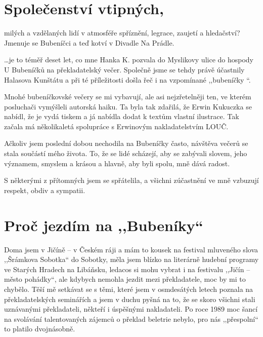  
\bigskip

\section{Společenství vtipných,}

\noindent
milých a vzdělaných lidí v atmosféře spříznění, legrace, zaujetí a hledačství? Jmenuje se Bubeníčci a teď kotví v Divadle Na Prádle. 

\ldots je to téměř deset let, co mne Hanka K. pozvala do Myslikovy ulice do hospody U Bubeníčků na překladatelský večer. Společně jsme se tehdy právě účastnily Halasova Kunštátu a při té příležitosti došla řeč i na vzpomínané ,,bubeníčky ``. 

Mnohé bubeníčkovské večery se mi vybavují, ale asi nejzřetelněji ten, ve kterém posluchači vymýšleli autorská haiku. Ta byla tak zdařilá, že Erwin Kukuczka se nabídl, že je vydá tiskem a já nabídla dodat k textům vlastní ilustrace. Tak začala má několikaletá spolupráce s Erwinovým nakladatelstvím LOUČ.

Ačkoliv jsem poslední dobou nechodila na Bubeníčky často, návštěva večerů se stala součástí mého života. To, že se lidé scházejí, aby se zabývali  slovem, jeho významem, smyslem a krásou a hlavně, aby byli spolu, mně dává radost.

S některými z přítomných jsem se spřátelila, a všichni zúčastnění ve mně vzbuzují respekt, obdiv a sympatii.


\bigskip

\section{Proč jezdím na ,,Bubeníky``}

\noindent
Doma jsem v Jičíně -- v Českém ráji a mám to kousek na festival mluveného slova ,,Šrámkova Sobotka`` do Sobotky, měla jsem blízko na literárně hudební programy ve Starých Hradech na Libáňsku, ledacos si mohu vybrat i na festivalu ,,Jičín -- město pohádky``, ale kdybych nemohla jezdit mezi překladatele, moc by mi to chybělo. Těší mě setkávat se s těmi, které jsem v osmdesátých letech poznala na překladatelských seminářích a jsem v duchu pyšná na to, že se skoro všichni stali uznávanými překladateli, někteří i úspěšnými nakladateli. Po roce 1989 moc šancí na svolávání talentovaných zájemců o překlad beletrie nebylo, pro nás ,,přespolní`` to platilo dvojnásobně. 


